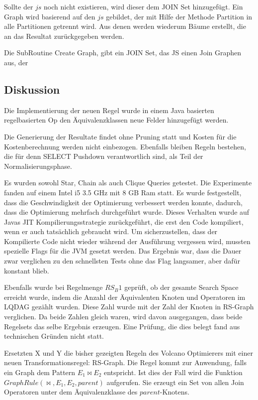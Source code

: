 Sollte der $js$ noch nicht existieren, wird dieser dem JOIN Set hinzugefügt. Ein Graph wird basierend auf den $js$ gebildet, der mit Hilfe der Methode Partition in alle Partitionen getrennt wird. Aus denen werden wiederum Bäume erstellt, die an das Resultat zurückgegeben werden.

Die SubRoutine Create Graph, gibt ein JOIN Set, das JS einen Join Graphen aus, der




\subsection{Diskussion}
Die Implementierung der neuen Regel wurde in einem Java basierten regelbasierten Op den Äquivalenzklassen neue Felder hinzugefügt werden.

Die Generierung der Resultate findet ohne Pruning statt und Kosten für die Kostenberechnung werden nicht einbezogen. Ebenfalls bleiben Regeln bestehen, die für denn SELECT Pushdown verantwortlich sind, als Teil der Normalisierungsphase. 

Es wurden sowohl Star, Chain als auch Clique Queries getestet. Die Experimente fanden auf einem Intel i5 3.5 GHz mit 8 GB Ram statt. Es wurde festgestellt, dass die Geschwindigkeit der Optimierung verbessert werden konnte, dadurch, dass die Optimierung mehrfach durchgeführt wurde. Dieses Verhalten wurde auf Javas JIT Kompilierungsstrategie zurückgeführt, die erst den Code kompiliert, wenn er auch tatsächlich gebraucht wird. Um sicherzustellen, dass der Kompilierte Code nicht wieder während der Ausführung vergessen wird, mussten spezielle Flags für die JVM gesetzt werden. Das Ergebnis war, dass die Dauer zwar verglichen zu den schnellsten Tests ohne das Flag langsamer, aber dafür konstant blieb.

Ebenfalls wurde bei Regelmenge $RS_B1$ geprüft, ob der gesamte Search Space erreicht wurde, indem die Anzahl der Äquivalenten Knoten und Operatoren im LQDAG gezählt wurden. Diese Zahl wurde mit der Zahl der Knoten in RS-Graph verglichen. Da beide Zahlen gleich waren, wird davon ausgegangen, dass beide Regelsets das selbe Ergebnis erzeugen. Eine Prüfung, die dies belegt fand aus technischen Gründen nicht statt.






Ersetzten X und Y die bisher gezeigten Regeln des Volcano Optimierers mit einer neuen Transformationsregel: RS-Graph. Die Regel kommt zur Anwendung, falls ein Graph dem Pattern $E_1 \Join E_2$ entspricht. Ist dies der Fall wird die Funktion $GraphRule(\Join, E_1, E_2, parent)$ aufgerufen. Sie erzeugt ein Set von allen Join Operatoren unter dem Äquivalenzklasse des $parent$-Knotens.








